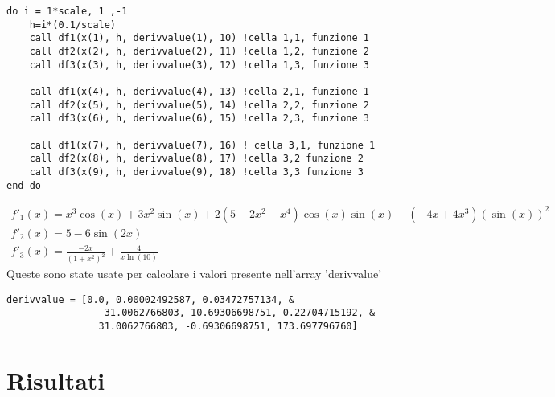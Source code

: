 \documentclass[a4paper]{article}
\begin{document}
{
\begin{lstlisting}[firstnumber = 205]
do i = 1*scale, 1 ,-1
    h=i*(0.1/scale)
    call df1(x(1), h, derivvalue(1), 10) !cella 1,1, funzione 1
    call df2(x(2), h, derivvalue(2), 11) !cella 1,2, funzione 2
    call df3(x(3), h, derivvalue(3), 12) !cella 1,3, funzione 3

    call df1(x(4), h, derivvalue(4), 13) !cella 2,1, funzione 1
    call df2(x(5), h, derivvalue(5), 14) !cella 2,2, funzione 2
    call df3(x(6), h, derivvalue(6), 15) !cella 2,3, funzione 3

    call df1(x(7), h, derivvalue(7), 16) ! cella 3,1, funzione 1
    call df2(x(8), h, derivvalue(8), 17) !cella 3,2 funzione 2
    call df3(x(9), h, derivvalue(9), 18) !cella 3,3 funzione 3
end do
\end{lstlisting}

\begin{gather*}
    f'_1(x)=x^3\cos(x)+3x^2\sin(x)+2(5-2x^2+x^4)\cos(x)\sin(x)+(-4x+4x^3)(\sin(x))^2 \\
    f'_2(x)=5-6\sin(2x) \\
    f'_3(x)=\frac{-2x}{(1+x^2)^2}+\frac{4}{x\ln(10)}
\end{gather*}
Queste sono state usate per calcolare i valori presente nell'array 'derivvalue' 
\begin{lstlisting}[firstnumber=219]
    derivvalue = [0.0, 0.00002492587, 0.03472757134, &
                -31.0062766803, 10.69306698751, 0.22704715192, &
                31.0062766803, -0.69306698751, 173.697796760]
\end{lstlisting}

\section{Risultati}
}
\end{document}
